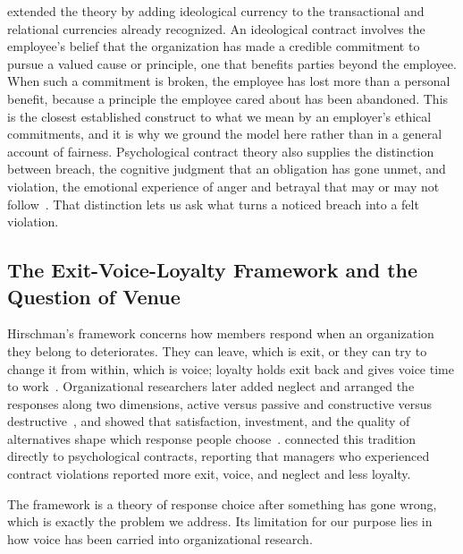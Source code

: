 \citet{thompson2003violations} extended the theory by adding ideological currency to the transactional and relational currencies already recognized. An ideological contract involves the employee's belief that the organization has made a credible commitment to pursue a valued cause or principle, one that benefits parties beyond the employee. When such a commitment is broken, the employee has lost more than a personal benefit, because a principle the employee cared about has been abandoned. This is the closest established construct to what we mean by an employer's ethical commitments, and it is why we ground the model here rather than in a general account of fairness. Psychological contract theory also supplies the distinction between breach, the cognitive judgment that an obligation has gone unmet, and violation, the emotional experience of anger and betrayal that may or may not follow~\citep{morrison1997employees}. That distinction lets us ask what turns a noticed breach into a felt violation.

\subsection{The Exit-Voice-Loyalty Framework and the Question of Venue}

Hirschman's framework concerns how members respond when an organization they belong to deteriorates. They can leave, which is exit, or they can try to change it from within, which is voice; loyalty holds exit back and gives voice time to work~\citep{hirschman1970exit}. Organizational researchers later added neglect and arranged the responses along two dimensions, active versus passive and constructive versus destructive~\citep{farrell1983exit}, and showed that satisfaction, investment, and the quality of alternatives shape which response people choose~\citep{rusbult1988impact}. \citet{turnley1999impact} connected this tradition directly to psychological contracts, reporting that managers who experienced contract violations reported more exit, voice, and neglect and less loyalty.

The framework is a theory of response choice after something has gone wrong, which is exactly the problem we address. Its limitation for our purpose lies in how voice has been carried into organizational research.

